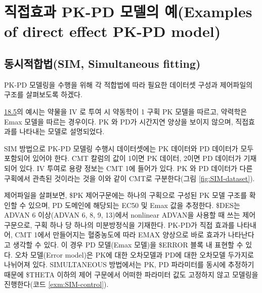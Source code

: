 \documentclass[
  10pt,
  krantz2,
  a4paper]{krantz}
\theoremstyle{definition}
\theoremstyle{definition}
\theoremstyle{definition}
\theoremstyle{remark}
\begin{document}
\hypertarget{direct-pkpd}{%
\section{직접효과 PK-PD 모델의 예(Examples of direct effect PK-PD model)}\label{direct-pkpd}}

\hypertarget{uxb3d9uxc2dcuxc801uxd569uxbc95sim-simultaneous-fitting}{%
\subsection{\texorpdfstring{동시적합법(SIM, Simultaneous fitting) }{동시적합법(SIM, Simultaneous fitting) }}\label{uxb3d9uxc2dcuxc801uxd569uxbc95sim-simultaneous-fitting}}

PK-PD 모델링을 수행을 위해 각 적합법에 따라 필요한 데이터셋 구성과 제어파일의 구조를 살펴보도록 하겠다.

\protect\hyperlink{direct-pkpd}{18.5}의 예시는 약물을 IV 로 투여 시 약동학이 1 구획 PK 모델을 따르고, 약력학은 Emax 모델을 따르는 경우이다. PK 와 PD가 시간지연 양상을 보이지 않으며, 직접효과를 나타내는 모델로 설명되었다.

SIM 방법으로 PK-PD 모델링 수행시 데이터셋에는 PK 데이터와 PD 데이터가 모두 포함되어 있어야 한다. CMT 칼럼의 값이 1이면 PK 데이터, 2이면 PD 데이터가 기재되어 있다. IV 투여로 용량 정보는 CMT 1에 들어가 있다. PK 와 PD 데이터가 다른 구획에서 관측된 것이라는 것을 이와 같이 CMT로 구분한다(그림 \ref{fig:SIM-dataset}).

제어파일을 살펴보면, \$PK 제어구문에는 하나의 구획으로 구성된 PK 모델 구조를 확인할 수 있으며, PD 도메인에 해당되는 EC50 및 Emax 값을 추정한다. \$DES는 ADVAN 6 이상(ADVAN 6, 8, 9, 13)에서 nonlinear ADVAN을 사용할 때 쓰는 제어구문으로, 구획 하나 당 하나의 미분방정식을 기재한다. PK-PD가 직접 효과를 나타내어, CMT 1에서 만들어지는 혈중농도에 따라 EMAX 양상으로 바로 효과가 나타난다고 생각할 수 있다. 이 경우 PD 모델(Emax 모델)을 \$ERROR 블록 내 표현할 수 있다. 오차 모델(Error model)은 PK에 대한 오차모델과 PD에 대한 오차모델 두가지로 나뉘어져 있다. SIMULTANEOUS 방법에서는 PK, PD 파라미터를 동시에 추정하기 때문에 \$THETA 이하의 제어 구문에서 어떠한 파라미터 값도 고정하지 않고 모델링을 진행한다(코드 \ref{exm:SIM-control}).
\end{document}
